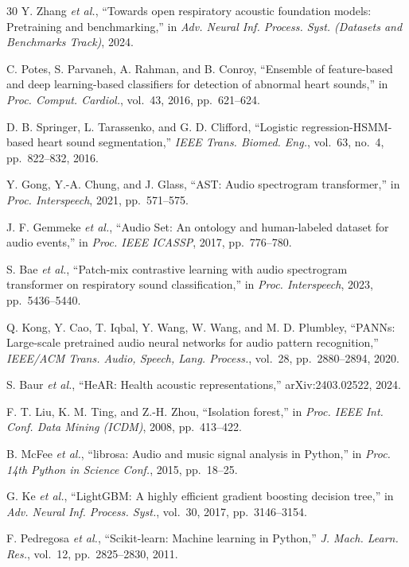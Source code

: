 \documentclass[conference]{IEEEtran}
\begin{document}
\begin{thebibliography}{30}
Y. Zhang \emph{et al.}, ``Towards open respiratory acoustic foundation models: Pretraining and benchmarking,'' in \emph{Adv. Neural Inf. Process. Syst. (Datasets and Benchmarks Track)}, 2024.

C. Potes, S. Parvaneh, A. Rahman, and B. Conroy, ``Ensemble of feature-based and deep learning-based classifiers for detection of abnormal heart sounds,'' in \emph{Proc. Comput. Cardiol.}, vol.~43, 2016, pp.~621--624.

D. B. Springer, L. Tarassenko, and G. D. Clifford, ``Logistic regression-HSMM-based heart sound segmentation,'' \emph{IEEE Trans. Biomed. Eng.}, vol.~63, no.~4, pp.~822--832, 2016.

Y. Gong, Y.-A. Chung, and J. Glass, ``AST: Audio spectrogram transformer,'' in \emph{Proc. Interspeech}, 2021, pp.~571--575.

J. F. Gemmeke \emph{et al.}, ``Audio Set: An ontology and human-labeled dataset for audio events,'' in \emph{Proc. IEEE ICASSP}, 2017, pp.~776--780.

S. Bae \emph{et al.}, ``Patch-mix contrastive learning with audio spectrogram transformer on respiratory sound classification,'' in \emph{Proc. Interspeech}, 2023, pp.~5436--5440.

Q. Kong, Y. Cao, T. Iqbal, Y. Wang, W. Wang, and M. D. Plumbley, ``PANNs: Large-scale pretrained audio neural networks for audio pattern recognition,'' \emph{IEEE/ACM Trans. Audio, Speech, Lang. Process.}, vol.~28, pp.~2880--2894, 2020.

S. Baur \emph{et al.}, ``HeAR: Health acoustic representations,'' arXiv:2403.02522, 2024.

F. T. Liu, K. M. Ting, and Z.-H. Zhou, ``Isolation forest,'' in \emph{Proc. IEEE Int. Conf. Data Mining (ICDM)}, 2008, pp.~413--422.

B. McFee \emph{et al.}, ``librosa: Audio and music signal analysis in Python,'' in \emph{Proc. 14th Python in Science Conf.}, 2015, pp.~18--25.

G. Ke \emph{et al.}, ``LightGBM: A highly efficient gradient boosting decision tree,'' in \emph{Adv. Neural Inf. Process. Syst.}, vol.~30, 2017, pp.~3146--3154.

F. Pedregosa \emph{et al.}, ``Scikit-learn: Machine learning in Python,'' \emph{J. Mach. Learn. Res.}, vol.~12, pp.~2825--2830, 2011.


\end{thebibliography}
\end{document}
